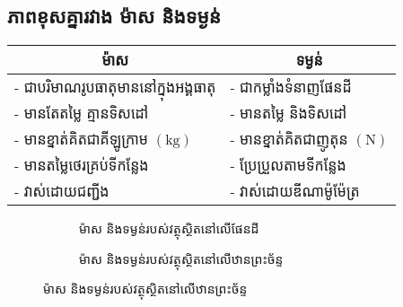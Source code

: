 \subsection{ភាពខុសគ្នារវាង ម៉ាស និងទម្ងន់}
\begin{center}
	\begin{tabular}{|l|l|}
		\hline
		\multicolumn{1}{|c|}{{\cellcolor[HTML]{96FFFB}\ak ម៉ាស}} & \multicolumn{1}{|c|}{{\cellcolor[HTML]{96FFFB}\ak ទម្ងន់}}\\
		\hline
		- ជាបរិមាណរូបធាតុមាននៅក្នុងអង្គធាតុ & 	
		- ជាកម្លាំងទំនាញផែនដី \\ 
		- មានតែតម្លៃ គ្មានទិសដៅ & 
		- មានតម្លៃ និងទិសដៅ\\ 
		- មានខ្នាត់គិតជាគីឡូក្រាម $\left(\si{\kilogram}\right)$ &
		- មានខ្នាត់គិតជាញូតុន $\left(\si{\newton}\right)$\\
		- មានតម្លៃថេរគ្រប់ទីកន្លែង &
		- ប្រែប្រួលតាមទីកន្លែង\\
		- វាស់ដោយជញ្ជីង & 
		- វាស់ដោយឌីណាម៉ូម៉ែត្រ\\
		\hline
	\end{tabular}
\end{center}
\begin{figure}[H]
	\centering
	\begin{subfigure}[b]{0.45\textwidth}
		\centering
		\caption{ម៉ាស និងទម្ងន់របស់វត្ថុស្ថិតនៅលើផែនដី}
	\end{subfigure}
	\begin{subfigure}[b]{0.45\textwidth}
		\centering
		\caption{ម៉ាស និងទម្ងន់របស់វត្ថុស្ថិតនៅលើឋានព្រះច័ន្ទ}
	\end{subfigure}
\end{figure}
